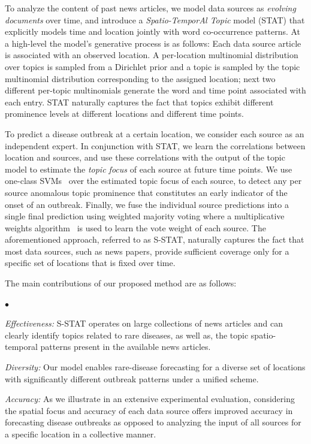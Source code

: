 \documentclass[conference]{IEEEtran}
\newcommand{\squishlist}{
   \begin{list}{$\bullet$}
    {
      \setlength{\itemsep}{0pt}
      \setlength{\parsep}{3pt}
      \setlength{\topsep}{3pt}
      \setlength{\partopsep}{0pt}
      \setlength{\leftmargin}{1.5em}
      \setlength{\labelwidth}{1em}
      \setlength{\labelsep}{0.5em} } }
\newcommand{\squishend}{
    \end{list}  }
\newcommand{\model}{{STAT}\xspace} %
\newcommand{\fullmodel}{{S-STAT}\xspace}
\begin{document}
To analyze the content of past news articles, we model data sources as {\em evolving documents} over time, and introduce a {\em Spatio-TemporAl Topic} model (\model) that explicitly models time and location jointly with word co-occurrence patterns.  At a high-level the model's generative process is as follows: Each data source article is associated with an observed location. A per-location multinomial distribution over topics is sampled from a Dirichlet prior and a topic is sampled by the topic multinomial distribution corresponding to the assigned location; next two different per-topic multinomials generate the word and time point associated with each entry. \model naturally captures the fact that topics exhibit different prominence levels at different locations and different time points. 

To predict a disease outbreak at a certain location, we consider each source as an independent expert.  In conjunction with \model, we learn the correlations between location and sources, and use these correlations with the output of the topic model to estimate the {\em topic focus} of each source at future time points.  We use one-class SVMs~\cite{schoelkopf:99} over the estimated topic focus of each source, to detect any per source anomalous topic prominence that constitutes an early indicator of the onset of an outbreak. Finally,  we fuse the individual source predictions into a single final prediction using weighted majority voting where a multiplicative weights algorithm~\cite{arora:2012} is used to learn the vote weight of each source. The aforementioned approach, referred to as \fullmodel, naturally captures the fact that most data sources, such as news papers, provide sufficient coverage only for a specific set of locations that is fixed over time.

The main contributions of our proposed method are as follows:
\squishlist
\item {\em Effectiveness:} \fullmodel operates on large collections of news articles and can clearly identify topics related to rare diseases, as well as, the topic spatio-temporal patterns present in the available news articles. 
\item {\em Diversity:} Our model enables rare-disease forecasting for a diverse set of locations with significantly different outbreak patterns under a unified scheme. 
\item {\em Accuracy:} As we illustrate in an extensive experimental evaluation, considering the spatial focus and accuracy of each data source offers improved accuracy in forecasting disease outbreaks as opposed to analyzing the input of all sources for a specific location in a collective manner. 
\squishend
\end{document}

